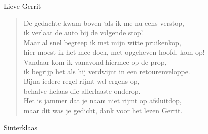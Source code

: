 \documentclass[12pt]{brief}
\begin{document}
\begin{letter}{Lieve Gerrit}
\begin{verse}
De gedachte kwam boven `als ik me nu eens verstop,\\
ik verlaat de auto bij de volgende stop'.\\
Maar al snel begreep ik met mijn witte pruikenkop,\\
hier moest ik het mee doen, met opgeheven hoofd, kom op!\\[0.5em]

Vandaar kom ik vanavond hiermee op de prop,\\
ik begrijp het als hij verdwijnt in een retourenveloppe.\\
Bijna iedere regel rijmt wel ergens op,\\
behalve helaas die allerlaaste onderop.\\
Het is jammer dat je naam niet rijmt op afsluitdop,\\
maar dit was je gedicht, dank voor het lezen Gerrit.\\[2em]

\end{verse}


Sinterklaas


\closing{}

\end{letter}
\end{document}
